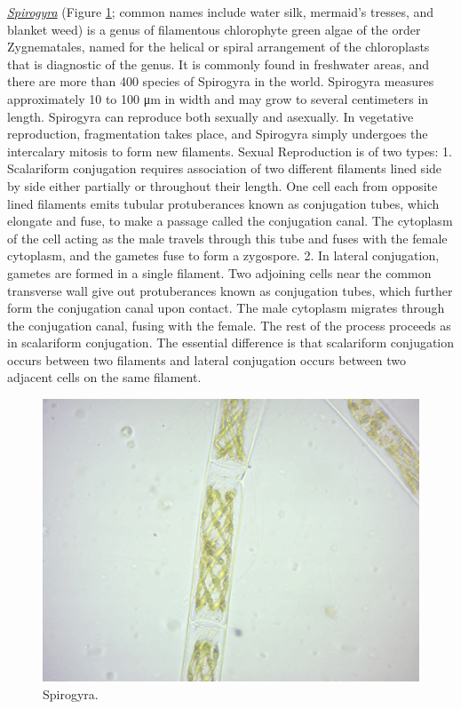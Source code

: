 \href{https://en.wikipedia.org/wiki/Spirogyra}{\emph{Spirogyra}} (Figure
\ref{fig:spiro}; common names include water silk, mermaid's tresses, and
blanket weed) is a genus of filamentous chlorophyte green algae of the
order Zygnematales, named for the helical or spiral arrangement of the
chloroplasts that is diagnostic of the genus. It is commonly found in
freshwater areas, and there are more than 400 species of Spirogyra in
the world. Spirogyra measures approximately 10 to 100 μm in width and
may grow to several centimeters in length. Spirogyra can reproduce both
sexually and asexually. In vegetative reproduction, fragmentation takes
place, and Spirogyra simply undergoes the intercalary mitosis to form
new filaments. Sexual Reproduction is of two types: 1. Scalariform
conjugation requires association of two different filaments lined side
by side either partially or throughout their length. One cell each from
opposite lined filaments emits tubular protuberances known as
conjugation tubes, which elongate and fuse, to make a passage called the
conjugation canal. The cytoplasm of the cell acting as the male travels
through this tube and fuses with the female cytoplasm, and the gametes
fuse to form a zygospore. 2. In lateral conjugation, gametes are formed
in a single filament. Two adjoining cells near the common transverse
wall give out protuberances known as conjugation tubes, which further
form the conjugation canal upon contact. The male cytoplasm migrates
through the conjugation canal, fusing with the female. The rest of the
process proceeds as in scalariform conjugation. The essential difference
is that scalariform conjugation occurs between two filaments and lateral
conjugation occurs between two adjacent cells on the same filament.

\begin{figure}

{\centering \includegraphics[width=0.7\linewidth]{./figures/protists/Spirogyra} 

}

\caption{Spirogyra.}\label{fig:spiro}
\end{figure}

